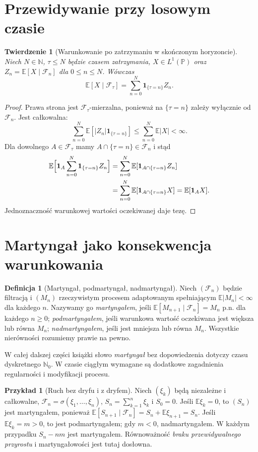 \documentclass[11pt,a4paper,oneside]{report}
\numberwithin{equation}{chapter}
\theoremstyle{plain}
\newtheorem{twierdzenie}{Twierdzenie}[chapter]
\theoremstyle{definition}
\newtheorem{definicja}{Definicja}[chapter]
\newtheorem{przyklad}{Przykład}[chapter]
\theoremstyle{remark}
\newcommand{\N}{\mathbb{N}}
\newcommand{\Prob}{\mathbb{P}}
\newcommand{\E}{\mathbb{E}}
\newcommand{\ind}[1]{\mathbf{1}_{#1}}
\begin{document}
\section{Przewidywanie przy losowym czasie}

\begin{twierdzenie}[Warunkowanie po zatrzymaniu w skończonym horyzoncie]
Niech $N\in\N$, $\tau\leq N$ będzie czasem
zatrzymania, $X\in L^1(\Prob)$ oraz
$Z_n=\E[X\mid\mathcal F_n]$ dla $0\leq n\leq N$.
Wówczas
\[
\E[X\mid\mathcal F_\tau]
=\sum_{n=0}^N\ind{\{\tau=n\}}Z_n.
\]
\end{twierdzenie}
\begin{proof}
Prawa strona jest $\mathcal F_\tau$-mierzalna,
ponieważ na $\{\tau=n\}$ zależy wyłącznie
od $\mathcal F_n$. Jest całkowalna:
\[
\sum_{n=0}^N\E[|Z_n|\ind{\{\tau=n\}}]
\leq\sum_{n=0}^N\E|X|<\infty.
\]
Dla dowolnego $A\in\mathcal F_\tau$ mamy
$A\cap\{\tau=n\}\in\mathcal F_n$ i stąd
\begin{align*}
\E\Bigl[\ind A\sum_{n=0}^N
\ind{\{\tau=n\}}Z_n\Bigr]
&=\sum_{n=0}^N\E[\ind{A\cap\{\tau=n\}}Z_n]\\
&=\sum_{n=0}^N\E[\ind{A\cap\{\tau=n\}}X]
=\E[\ind A X].
\end{align*}
Jednoznaczność warunkowej wartości oczekiwanej
daje tezę.
\end{proof}

\section{Martyngał jako konsekwencja warunkowania}

\begin{definicja}[Martyngał, podmartyngał, nadmartyngał]
Niech $(\mathcal F_n)$ będzie filtracją i
$(M_n)$ rzeczywistym procesem adaptowanym
spełniającym $\E|M_n|<\infty$ dla każdego $n$.
Nazywamy go \emph{martyngałem}, jeśli
$\E[M_{n+1}\mid\mathcal F_n]=M_n$ p.n.
dla każdego $n\geq0$;
\emph{podmartyngałem}, jeśli warunkowa wartość
oczekiwana jest większa lub równa $M_n$;
\emph{nadmartyngałem}, jeśli jest mniejsza
lub równa $M_n$. Wszystkie nierówności
rozumiemy prawie na pewno.
\end{definicja}

W całej dalszej części książki słowo \emph{martyngał}
bez dopowiedzenia dotyczy czasu dyskretnego
$\N_0$. W czasie ciągłym wymagane są dodatkowe
zagadnienia regularności i modyfikacji procesu.

\begin{przyklad}[Ruch bez dryfu i z dryfem]
Niech $(\xi_k)$ będą niezależne i całkowalne,
$\mathcal F_n=\sigma(\xi_1,\ldots,\xi_n)$,
$S_n=\sum_{k=1}^n\xi_k$ i $S_0=0$.
Jeśli $\E\xi_k=0$, to $(S_n)$ jest martyngałem,
ponieważ
$\E[S_{n+1}\mid\mathcal F_n]
=S_n+\E\xi_{n+1}=S_n$.
Jeśli $\E\xi_k=m>0$, to jest podmartyngałem;
gdy $m<0$, nadmartyngałem. W każdym przypadku
$S_n-nm$ jest martyngałem. Równoważność
\emph{braku przewidywalnego przyrostu}
i martyngałowości jest tutaj dosłowna.
\end{przyklad}
\end{document}
